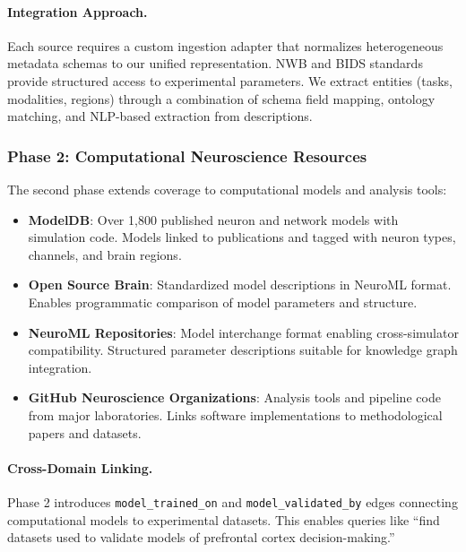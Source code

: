 \documentclass{article}
\theoremstyle{definition}
\begin{document}
\paragraph{Integration Approach.} Each source requires a custom ingestion adapter that normalizes heterogeneous metadata schemas to our unified representation. NWB and BIDS standards provide structured access to experimental parameters. We extract entities (tasks, modalities, regions) through a combination of schema field mapping, ontology matching, and NLP-based extraction from descriptions.

\subsubsection{Phase 2: Computational Neuroscience Resources}

The second phase extends coverage to computational models and analysis tools:

\begin{itemize}
    \item \textbf{ModelDB}: Over 1,800 published neuron and network models with simulation code. Models linked to publications and tagged with neuron types, channels, and brain regions.

    \item \textbf{Open Source Brain}: Standardized model descriptions in NeuroML format. Enables programmatic comparison of model parameters and structure.

    \item \textbf{NeuroML Repositories}: Model interchange format enabling cross-simulator compatibility. Structured parameter descriptions suitable for knowledge graph integration.

    \item \textbf{GitHub Neuroscience Organizations}: Analysis tools and pipeline code from major laboratories. Links software implementations to methodological papers and datasets.
\end{itemize}

\paragraph{Cross-Domain Linking.} Phase 2 introduces \texttt{model\_trained\_on} and \texttt{model\_validated\_by} edges connecting computational models to experimental datasets. This enables queries like ``find datasets used to validate models of prefrontal cortex decision-making.''
\end{document}
